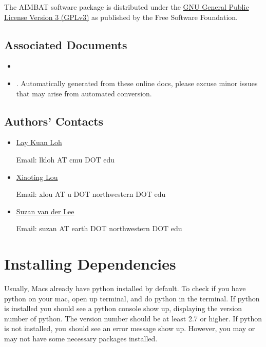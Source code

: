 \documentclass[letterpaper,10pt,english]{sphinxmanual}
\begin{document}
The AIMBAT software package is distributed under the \href{http://www.gnu.org/licenses/gpl.html}{GNU General Public License Version 3 (GPLv3)} as published by the Free Software Foundation.


\section{Associated Documents}
\label{docfiles/introduction:associated-documents}\begin{itemize}
\item {} 

\item {} 
. Automatically generated from these online docs, please excuse minor issues that may arise from automated conversion.

\end{itemize}


\section{Authors' Contacts}
\label{docfiles/introduction:authors-contacts}\label{docfiles/introduction:id5}\begin{itemize}
\item {} 
\href{http://lkloh2410.wordpress.com/}{Lay Kuan Loh}

Email: lkloh AT cmu DOT edu

\item {} 
\href{http://www.earth.northwestern.edu/~xlou/Welcome.html}{Xiaoting Lou}

Email: xlou AT u DOT northwestern DOT edu

\item {} 
\href{http://www.earth.northwestern.edu/research/suzan/}{Suzan van der Lee}

Email: suzan AT earth DOT northwestern DOT edu

\end{itemize}


\chapter{Installing Dependencies}
\label{docfiles/install_dependencies:installing-dependencies}\label{docfiles/install_dependencies::doc}
Usually, Macs already have python installed by default. To check if you have python on your mac, open up terminal, and do python in the terminal. If python is installed you should see a python console show up, displaying the version number of python. The version number should be at least 2.7 or higher. If python is not installed, you should see an error message show up. However, you may or may not have some necessary packages installed.
\end{document}
